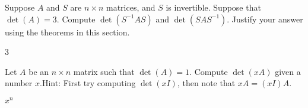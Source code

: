\begin{exercise}
Suppose $A$ and $S$ are $n \times n$ matrices, and $S$ is invertible.
Suppose that $\det(A) = 3$.  Compute $\det(S^{-1}AS)$ and 
$\det(SAS^{-1})$.  Justify your answer using the theorems in this section.
\end{exercise}
\comboSol{%
}
{%
3
}

\begin{exercise}
Let $A$ be an $n \times n$ matrix such that $\det(A)=1$.
Compute $\det(x A)$ given a number $x$.\linebreak[2]
Hint: First try computing
$\det(xI)$, then note that $xA = (xI)A$.
\end{exercise}
\comboSol{%
}
{%
$x^n$
}

\setcounter{exercise}{100}







